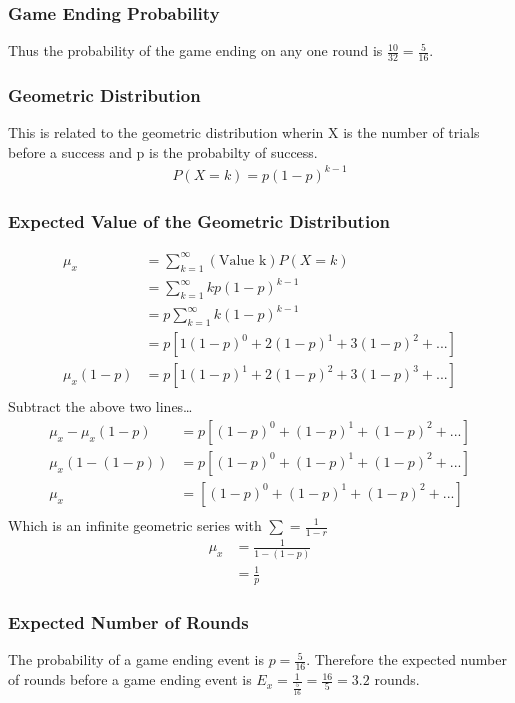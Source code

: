 \documentclass[12pt]{article}
\begin{document}
\subsubsection{Game Ending Probability}
Thus the probability of the game ending on any one round is $\frac{10}{32} = \frac{5}{16}$.
\subsubsection{Geometric Distribution}
This is related to the geometric distribution wherin X is the number of trials before a success and p is the 
probabilty of success.
\begin{align*}
P(X=k)=p(1-p)^{k-1}
\end{align*}
\subsubsection{Expected Value of the Geometric Distribution}
\begin{align*}
\mu_x&=\sum_{k=1}^{\infty}(\text{Value k})P(X=k)\\
&=\sum_{k=1}^{\infty}kp(1-p)^{k-1}\\
&=p\sum_{k=1}^{\infty}k(1-p)^{k-1}\\
&=p[1(1-p)^0+2(1-p)^1+3(1-p)^2+...]\\
\mu_x(1-p)&=p[1(1-p)^1+2(1-p)^2+3(1-p)^3+...]\\
\end{align*}
Subtract the above two lines\ldots
\begin{align*}
\mu_x-\mu_x(1-p)&=p[(1-p)^0+(1-p)^1+(1-p)^2+...]\\
\mu_x(1-(1-p))&=p[(1-p)^0+(1-p)^1+(1-p)^2+...]\\
\mu_x&=[(1-p)^0+(1-p)^1+(1-p)^2+...]\\
\end{align*}
Which is an infinite geometric series with $\sum = \frac{1}{1-r}$
\begin{align*}
\mu_x &= \frac{1}{1-(1-p)}\\
&= \frac{1}{p}
\end{align*}

\subsubsection{Expected Number of Rounds}
The probability of a game ending event is $p=\frac{5}{16}$. Therefore the expected number of rounds before a game 
ending event is $E_x=\frac{1}{\frac{5}{16}}=\frac{16}{5}=3.2$ rounds.
\end{document}
